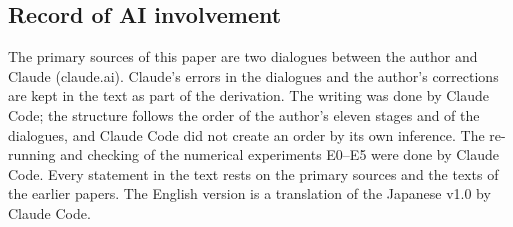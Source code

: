 \documentclass[
  a4paper,
]{article}
\begin{document}
\subsection{Record of AI involvement}\label{record-of-ai-involvement}

The primary sources of this paper are two dialogues between the author
and Claude (claude.ai). Claude's errors in the dialogues and the
author's corrections are kept in the text as part of the derivation. The
writing was done by Claude Code; the structure follows the order of the
author's eleven stages and of the dialogues, and Claude Code did not
create an order by its own inference. The re-running and checking of the
numerical experiments E0--E5 were done by Claude Code. Every statement
in the text rests on the primary sources and the texts of the earlier
papers. The English version is a translation of the Japanese v1.0 by
Claude Code.
\end{document}
